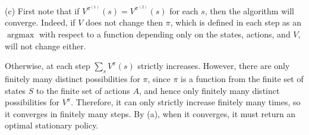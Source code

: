 \documentclass[12pt]{article}
\DeclareMathOperator{\argmax}{argmax}
\theoremstyle{remark}
\begin{document}
\noindent (c) First note that if $V^{\pi^{(1)}}(s) = V^{\pi^{(2)}}(s)$ for each $s$, then the algorithm will converge. Indeed, if $V$ does not change then $\pi$, which is defined in each step as an $\argmax$ with respect to a function depending only on the states, actions, and $V$, will not change either. 

Otherwise, at each step $\sum_s V^{\pi}(s)$ strictly increases. However, there are only finitely many distinct possibilities for $\pi$, since $\pi$ is a function from the finite set of states $S$ to the finite set of actions $A$, and hence only finitely many distinct possibilities for $V^{\pi}$. Therefore, it can only strictly increase finitely many times, so it converges in finitely many steps. By (a), when it converges, it must return an optimal stationary policy. 
\end{document}
